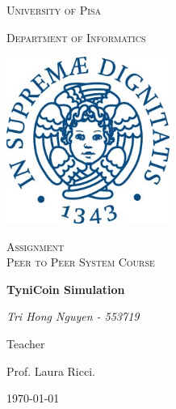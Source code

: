 \documentclass[14pt,a4paper]{report}
\begin{document}
	\begin{titlepage}
		\centering
		{\scshape\LARGE University of Pisa \par}
		{\scshape Department of Informatics\par}
		\vspace{1.0cm}
		\includegraphics[width=0.4\textwidth]{image/Unipi_Image}\par\vspace{1cm}
		
		\vspace{0.5cm}
		{\scshape\Large Assignment\\Peer to Peer System Course\par}
		\vspace{1.cm}
		{\huge\bfseries TyniCoin Simulation\par}
		\vspace{2cm}
		{\Large\itshape Tri Hong Nguyen - 553719\par}
		\vfill
		Teacher\par
		Prof. Laura Ricci.
		
		\vfill
		
		{\large \today\par}
	\end{titlepage}
\end{document}
